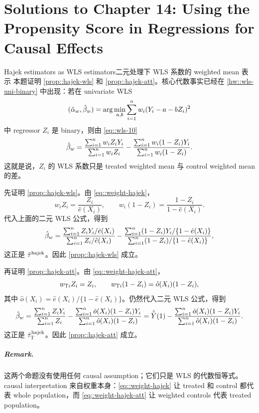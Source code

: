 \chapter{Solutions to Chapter 14: Using the Propensity Score in Regressions for Causal Effects}
\label{sol:chapter14}

\begin{exercisesolution}{Hajek estimators as WLS estimators}{二元处理下 WLS 系数的 weighted mean 表示}
本题证明 \cref{prop::hajek-wls} 和 \cref{prop::hajek-att}。核心代数事实已经在 \cref{hw::wls-uni-binary} 中出现：若在 univariate WLS
\[
(\hat \alpha_w,\hat\beta_w)
=\arg\min_{a,b}\sum_{i=1}^n w_i(Y_i-a-bZ_i)^2
\]
中 regressor $Z_i$ 是 binary，则由 \cref{eq::wls-10}
\[
\hat\beta_w
=\frac{\sum_{i=1}^n w_iZ_iY_i}{\sum_{i=1}^n w_iZ_i}
 -\frac{\sum_{i=1}^n w_i(1-Z_i)Y_i}{\sum_{i=1}^n w_i(1-Z_i)}.
\]
这就是说，$Z_i$ 的 WLS 系数只是 treated weighted mean 与 control weighted mean 的差。

先证明 \cref{prop::hajek-wls}。由 \cref{eq::weight-hajek}，
\[
w_iZ_i=\frac{Z_i}{\hat e(X_i)},\qquad
w_i(1-Z_i)=\frac{1-Z_i}{1-\hat e(X_i)}.
\]
代入上面的二元 WLS 公式，得到
\[
\hat\beta_w
=
\frac{\sum_{i=1}^n Z_iY_i/\hat e(X_i)}{\sum_{i=1}^n Z_i/\hat e(X_i)}
-
\frac{\sum_{i=1}^n (1-Z_i)Y_i/\{1-\hat e(X_i)\}}
     {\sum_{i=1}^n (1-Z_i)/\{1-\hat e(X_i)\}},
\]
这正是 $\hat\tau^{\textup{hajek}}$。因此 \cref{prop::hajek-wls} 成立。

再证明 \cref{prop::hajek-att}。由 \cref{eq::weight-hajek-att}，
\[
w_{\textsc{T}i}Z_i=Z_i,\qquad
w_{\textsc{T}i}(1-Z_i)=\hat o(X_i)(1-Z_i),
\]
其中 $\hat o(X_i)=\hat e(X_i)/\{1-\hat e(X_i)\}$。仍然代入二元 WLS 公式，得到
\[
\hat\beta_w
=
\frac{\sum_{i=1}^n Z_iY_i}{\sum_{i=1}^n Z_i}
-
\frac{\sum_{i=1}^n \hat o(X_i)(1-Z_i)Y_i}
     {\sum_{i=1}^n \hat o(X_i)(1-Z_i)}
=\hat{\bar Y}(1)
-
\frac{\sum_{i=1}^n \hat o(X_i)(1-Z_i)Y_i}
     {\sum_{i=1}^n \hat o(X_i)(1-Z_i)}.
\]
这正是 $\hat\tau_\textsc{T}^{\textup{hajek}}$。因此 \cref{prop::hajek-att} 成立。

\paragraph{Remark.}
这两个命题没有使用任何 causal assumption；它们只是 WLS 的代数恒等式。causal interpretation 来自权重本身：\cref{eq::weight-hajek} 让 treated 和 control 都代表 whole population，而 \cref{eq::weight-hajek-att} 让 weighted controls 代表 treated population。
\end{exercisesolution}

